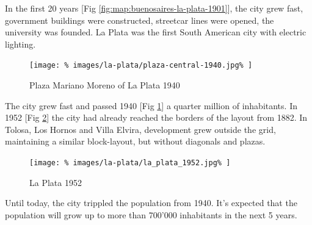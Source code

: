 \documentclass{article}
\begin{document}
\begin{multicols}{2}
			
			
			In the first 20 years [Fig \ref{fig:map:buenosaires-la-plata-1901}], the city grew fast, government buildings were constructed, streetcar lines were opened, the university was founded. La Plata was the first South American city with electric lighting.
			
			
			
			
			\begin{figure}[H]
				\texttt{[image: \%
					images/la-plata/plaza-central-1940.jpg\%
				]}
				\caption{Plaza Mariano Moreno of La Plata 1940  \cite{Blogspot:Arqruotolo:la-plata-o-la-geometria-hecha-espacio}}
				\label{fig:img:la-plata-1940}
			\end{figure}
			
			The city grew fast and passed 1940 [Fig \ref{fig:img:la-plata-1940}] a quarter million of inhabitants.
			In 1952 [Fig \ref{fig:map:la-plata-1952}] the city had already reached the borders of the layout from 1882. In Tolosa, Los Hornos and Villa Elvira, development grew outside the grid, maintaining a similar block-layout, but without diagonals and plazas.
			
			\begin{figure}[H]
				\texttt{[image: \%
					images/la-plata/la\_plata\_1952.jpg\%
				]}
				\caption{La Plata 1952 \cite{MOSP:InvestigacionHistorica}}
				\label{fig:map:la-plata-1952}
			\end{figure}
			
			
			Until today, the city trippled the population from 1940.
			It's expected that the population will grow up to more than 700'000 inhabitants in the next 5 years.
			

\end{multicols}
\end{document}
